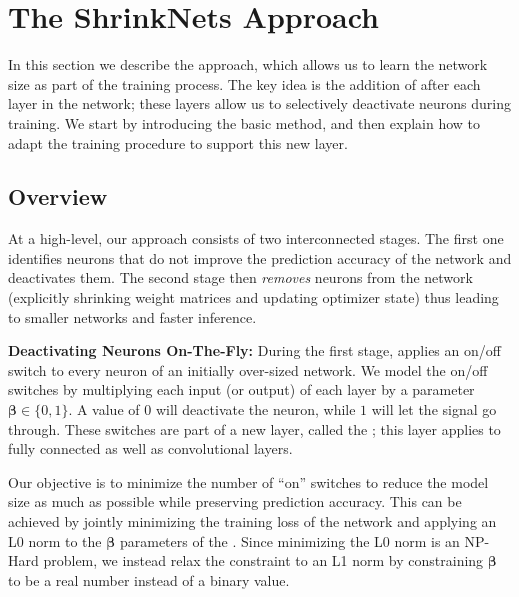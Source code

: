 
\section{The ShrinkNets Approach}
\label{sec:approach}

In this section we describe the \shrink approach, which allows us to learn
the network size as part of the training process. The key idea is the addition
of \swls after each layer in the network;  these layers
allow us to selectively deactivate neurons during training.  We start by introducing the
basic method, and then explain how to adapt the training procedure to support this new
layer. 

\subsection{Overview}

At a high-level, our approach consists of two interconnected stages.
The first one identifies neurons that do not improve the
prediction accuracy of the network and deactivates them. 
The second stage then {\it removes} neurons from the network (explicitly
shrinking weight matrices and updating optimizer state) thus leading to 
smaller networks and faster inference. 

\noindent\textbf{Deactivating Neurons On-The-Fly: }During the first stage,
\shrink applies an on/off switch to every neuron of an initially over-sized
network. We model the on/off switches by multiplying each input (or output) of
each layer by a parameter $\bm{\beta}\in\{0,1\}$. A value of $0$
will deactivate the neuron, while $1$ will let the signal go through. These
switches are part of a new layer, called the \swl; this layer applies 
to fully connected as well as convolutional layers.

Our objective is to minimize the number of ``on'' switches to reduce the model size as much
as possible while preserving prediction accuracy. This can be achieved by jointly
minimizing the training loss of the network and applying an L0 norm to the 
$\bm{\beta}$ parameters of the \swl. 
Since minimizing the L0 norm is an NP-Hard problem, we instead relax the constraint
to an L1 norm by constraining $\bm{\beta}$ to be a real number
instead of a binary value.


